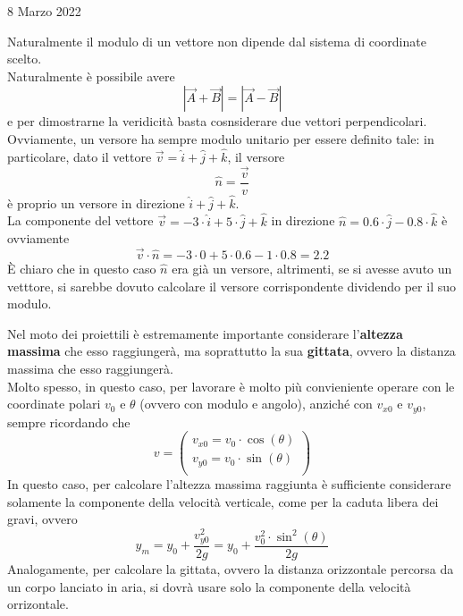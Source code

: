 \documentclass[a4paper]{extarticle}
\begin{document}
\newpage

\noindent
\begin{center}
  8 Marzo 2022
\end{center}
Naturalmente il modulo di un vettore non dipende dal sistema di coordinate scelto.\\
Naturalmente è possibile avere
\[\left \vert \vec{A} + \vec{B} \right \vert = \left \vert \vec{A} - \vec{B} \right \vert\]
e per dimostrarne la veridicità basta cosnsiderare due vettori perpendicolari.\\
Ovviamente, un versore ha sempre modulo unitario per essere definito tale: in particolare, dato il vettore $\vec{v} = \hat{i} + \hat{j} + \hat{k}$, il versore
\[\hat{n} = \frac{\vec{v}}{v}\]
è proprio un versore in direzione $\hat{i} + \hat{j} + \hat{k}$.\\
La componente del vettore $\vec{v} = -3 \cdot \hat{i} + 5 \cdot \hat{j} + \hat{k}$ in direzione $\hat{n} = 0.6 \cdot \hat{j} - 0.8 \cdot \hat{k}$ è ovviamente
\[\vec{v} \cdot \hat{n} = -3 \cdot 0 + 5 \cdot 0.6 - 1 \cdot 0.8 = 2.2\]
È chiaro che in questo caso $\hat{n}$ era già un versore, altrimenti, se si avesse avuto un vetttore, si sarebbe dovuto calcolare il versore corrispondente dividendo per il suo modulo.

\vspace{1em}
\noindent
Nel moto dei proiettili è estremamente importante considerare l'\textbf{altezza massima} che esso raggiungerà, ma soprattutto la sua \textbf{gittata}, ovvero la distanza massima che esso raggiungerà.\\
Molto spesso, in questo caso, per lavorare è molto più convieniente operare con le coordinate polari $v_0$ e $\theta$ (ovvero con modulo e angolo), anziché con $v_{x0}$ e $v_{y0}$, sempre ricordando che
\[v = \left(
  \begin{array}{l}
    v_{x0} = v_0 \cdot \cos(\theta)\\
    v_{y0} = v_0 \cdot \sin(\theta)\\
  \end{array}
\right)\]
In questo caso, per calcolare l'altezza massima raggiunta è sufficiente considerare solamente la componente della velocità verticale, come per la caduta libera dei gravi, ovvero
\[y_m = y_0 + \frac{v_{y0}^2}{2g} = y_0 + \frac{v_0^2 \cdot \sin^2(\theta)}{2g}\]
Analogamente, per calcolare la gittata, ovvero la distanza orizzontale percorsa da un corpo lanciato in aria, si dovrà usare solo la componente della velocità orrizontale.
\end{document}
